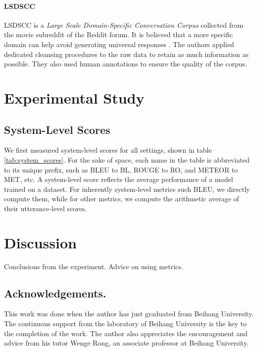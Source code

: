 \documentclass[runningheads]{llncs}
\begin{document}
    \paragraph{LSDSCC}
    LSDSCC \cite{LSDSCC} is a \emph{Large Scale Domain-Specific Conversation Corpus} collected from the movie subreddit of the Reddit forum. It is believed that a more specific domain can help avoid generating universal responses \cite{LSDSCC}. The authors applied dedicated cleansing procedures to the raw data to retain as much information as possible. They also used human annotations to ensure the quality of the corpus.

    \section{Experimental Study}
    \subsection{System-Level Scores}
    We first measured system-level scores for all settings, shown in table \ref{tab:system_scores}. For the sake of space, each name in the table is abbreviated to its unique prefix, such as BLEU to BL, ROUGE to RO, and METEOR to MET, etc. A system-level score reflects the average performance of a model trained on a dataset. For inherently system-level metrics such BLEU, we directly compute them, while for other metrics, we compute the arithmetic average of their utterance-level scores.
    

    \section{Discussion}
    Conclusions from the experiment.
    Advice on using metrics.

    \subsection*{Acknowledgements.}
    This work was done when the author has just graduated from Beihang University. The continuous support from the laboratory of Beihang University is the key to the completion of the work. The author also appreciates the encouragement and advice from his tutor Wenge Rong, an associate professor at Beihang University.

    
    
\end{document}
